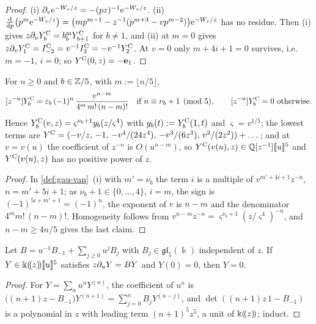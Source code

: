 \begin{proof}
(i) $\partial_v\mathrm{e}^{-W_{v}/z}=-(pz)^{-1}\mathrm{e}^{-W_{v}/z}$. (ii) $\frac{\mathrm{d}}{\mathrm{d} p}\bigl(p^m\mathrm{e}^{-W_{v}/z}\bigr)=\bigl(mp^{m-1}-z^{-1}(p^{m+3}-vp^{m-2})\bigr)\mathrm{e}^{-W_{v}/z}$ has no residue. Then (i) gives $z\partial_vY^{\mathrm{C}}_b=b^{\mathrm m}_bY^{\mathrm{C}}_{b+1}$ for $b\neq1$, and (ii) at $m=0$ gives $z\partial_vY^{\mathrm{C}}_1=I^{\mathrm{C}}_{-2}=v^{-1}I^{\mathrm{C}}_3=-v^{-1}Y^{\mathrm{C}}_2$. At $v=0$ only $m+4i+1=0$ survives, i.e.\ $m=-1$, $i=0$; so $Y^{\mathrm{C}}(0,z)=-\mathbf e_1$.
\end{proof}

\begin{lem}[Shape of $\YC$]
\label{lem:gau-vanshape}
For $n\geq0$ and $b\in\mathbb{Z}/5$, with $m:=\lfloor n/5\rfloor$,
\[
\coef{z^{-n}}\YC_b=\varepsilon_b\,(-1)^n\,\frac{v^{n-m}}{4^m\,m!\,(n-m)!}\quad\text{if }n\equiv\nu_b+1\pmod5,\qquad \coef{z^{-n}}\YC_b=0\ \text{otherwise}.
\]
Hence $Y^{\mathrm{C}}_b(v,z)=\varsigma^{\nu_b+1}y_b(z/\varsigma^4)$ with $y_b(t):=Y^{\mathrm{C}}_b(1,t)$ and $\varsigma=v^{1/5}$; the lowest terms are $Y^{\mathrm{C}}=(-v/z,\,-1,\,-v^4/(24z^4),\,-v^3/(6z^3),\,v^2/(2z^2))+\dots$; and at $v=v(u)$ the coefficient of $z^{-n}$ is $O(u^{n-m})$, so $Y^{\mathrm{C}}(v(u),z)\in\mathbb{Q}[z^{-1}][\![ u ]\!]^5$ and $Y^{\mathrm{C}}(v(u),z)$ has no positive power of $z$.
\end{lem}

\begin{proof}
In \cref{def:gau-van}~(i) with $m'=\nu_b$ the term $i$ is a multiple of $v^{m'+4i+1}z^{-n}$, $n=m'+5i+1$; as $\nu_b+1\in\{0,\dots,4\}$, $i=m$, the sign is $(-1)^{5i+m'+1}=(-1)^n$, the exponent of $v$ is $n-m$ and the denominator $4^mm!\,(n-m)!$. Homogeneity follows from $v^{n-m}z^{-n}=\varsigma^{\nu_b+1}(z/\varsigma^4)^{-n}$, and $n-m\geq4n/5$ gives the last claim.
\end{proof}

\begin{lem}
\label{lem:gau-uniq}
Let $B=u^{-1}B_{-1}+\sum_{j\geq0}u^jB_j$ with $B_j\in\mathfrak{gl}_5(\Bbbk)$ independent of $z$. If $Y\in\Bbbk(\!(z)\!)[\![ u ]\!]^5$ satisfies $z\partial_uY=BY$ and $Y(0)=0$, then $Y=0$.
\end{lem}

\begin{proof}
For $Y=\sum_nu^nY^{(n)}$, the coefficient of $u^n$ is $\bigl((n+1)z-B_{-1}\bigr)Y^{(n+1)}=\sum_{j=0}^nB_jY^{(n-j)}$, and $\det((n+1)z\,1-B_{-1})$ is a polynomial in $z$ with leading term $(n+1)^5z^5$, a unit of $\Bbbk(\!(z)\!)$; induct.
\end{proof}

